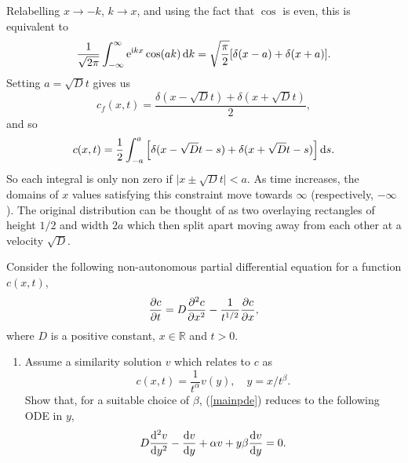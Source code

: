 \documentclass[a4paper, 12pt]{article}
\begin{document}
\begin{enumerate}[label={\bf \arabic{*}.\;}, ref={\arabic{*}},itemsep=3ex, left=0ex]
{\begin{enumerate}[label=(\alph*)]
{\begin{equation}
            \end{equation}
            Relabelling $x \to -k$, $k \to x$, and using the fact that $\cos$ is even, this is equivalent to
            \begin{equation}
              \frac{1}{\sqrt{2\pi}}\int_{-\infty}^\infty \mathrm{e}^{\mathrm{i} k x} \cos(ak)\, {\mathrm d} k = \sqrt{\frac{\pi}{2}}[\delta(x-a) + \delta(x+a)].
            \end{equation}
            Setting $a=\sqrt{D}t$ gives us
            \begin{equation}
              c_f(x,t) =\frac{\delta(x-\sqrt{D}t) + \delta(x+\sqrt{D}t)}{2},
            \end{equation}
            and so
            \begin{equation}
              c(x,t) =\frac{1}{2}\int_{-a}^{a}\left[\delta(x-\sqrt{D}t-s) + \delta(x+\sqrt{D}t -s)\right]{\mathrm d}{s}.
            \end{equation}
            So each integral is only non zero if $\vert x \pm \sqrt{D}t\vert<a$. As time increases, the domains of $x$ values satisfying this constraint move towards $\infty$ (respectively, $-\infty$). The original distribution can be thought of as two overlaying rectangles of height $1/2$ and width $2a$ which then split apart moving away from each other at a velocity $\sqrt{D}$.
          }
      \end{enumerate}

    }


    {
      Consider the following non-autonomous partial differential equation for a function $c(x,t)$,
      \begin{equation}
        \label{mainpde}
        \pd{c}{t} = D\pdd{c}{x} - \frac{1}{t^{1/2}}\pd{c}{x},
      \end{equation}
      where $D$ is a positive constant, $x\in\mathbb{R}$ and $t>0$.
      \begin{enumerate}[label=(\alph*)]
        \item
          Assume a similarity solution $v$ which relates to $c$ as
          \begin{equation}
            c(x,t)  = \frac{1}{t^{\alpha}}v(y),\quad y = x/t^{\beta}.
          \end{equation}
          Show that, for a suitable choice of  $\beta$, (\ref{mainpde}) reduces to the following ODE in $y$,
          \begin{equation}
            D\fdd{v}{y} -\fd{v}{y} + \alpha v + y\beta\fd{v}{y}=0.
          \end{equation}


\end{enumerate}}
\end{enumerate}
\end{document}
